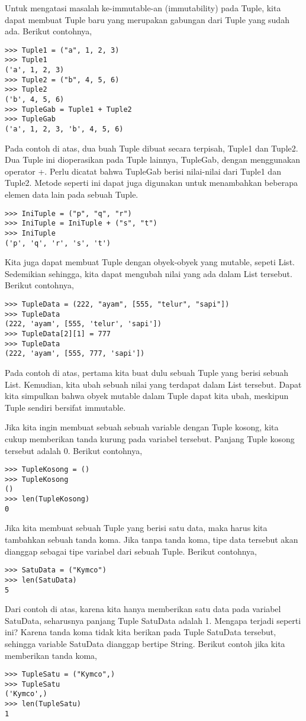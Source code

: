 Untuk mengatasi masalah ke-immutable-an (immutability) pada Tuple, kita dapat membuat Tuple baru yang merupakan gabungan dari Tuple yang sudah ada. Berikut contohnya,
\begin{verbatim}
>>> Tuple1 = ("a", 1, 2, 3)
>>> Tuple1
('a', 1, 2, 3)
>>> Tuple2 = ("b", 4, 5, 6)
>>> Tuple2
('b', 4, 5, 6)
>>> TupleGab = Tuple1 + Tuple2
>>> TupleGab
('a', 1, 2, 3, 'b', 4, 5, 6)
\end{verbatim}

Pada contoh di atas, dua buah Tuple dibuat secara terpisah, Tuple1 dan Tuple2. Dua Tuple ini dioperasikan pada Tuple lainnya, TupleGab, dengan menggunakan operator +. Perlu dicatat bahwa TupleGab berisi nilai-nilai dari Tuple1 dan Tuple2. Metode seperti ini dapat juga digunakan untuk menambahkan beberapa elemen data lain pada sebuah Tuple.
\begin{verbatim}
>>> IniTuple = ("p", "q", "r")
>>> IniTuple = IniTuple + ("s", "t")
>>> IniTuple
('p', 'q', 'r', 's', 't')
\end{verbatim}

Kita juga dapat membuat Tuple dengan obyek-obyek yang mutable, sepeti List. Sedemikian sehingga, kita dapat mengubah nilai yang ada dalam List tersebut. Berikut contohnya,
\begin{verbatim}
>>> TupleData = (222, "ayam", [555, "telur", "sapi"])
>>> TupleData
(222, 'ayam', [555, 'telur', 'sapi'])
>>> TupleData[2][1] = 777
>>> TupleData
(222, 'ayam', [555, 777, 'sapi'])
\end{verbatim}
Pada contoh di atas, pertama kita buat dulu sebuah Tuple yang berisi sebuah List. Kemudian, kita ubah sebuah nilai yang terdapat dalam List tersebut. Dapat kita simpulkan bahwa obyek mutable dalam Tuple dapat kita ubah, meskipun Tuple sendiri bersifat immutable.

Jika kita ingin membuat sebuah sebuah variable dengan Tuple kosong, kita cukup memberikan tanda kurung pada variabel tersebut. Panjang Tuple kosong tersebut adalah 0. Berikut contohnya,
\begin{verbatim}
>>> TupleKosong = ()
>>> TupleKosong
()
>>> len(TupleKosong)
0
\end{verbatim}
Jika kita membuat sebuah Tuple yang berisi satu data, maka harus kita tambahkan sebuah tanda koma. Jika tanpa tanda koma, tipe data tersebut akan dianggap sebagai tipe variabel dari sebuah Tuple. Berikut contohnya,
\begin{verbatim}
>>> SatuData = ("Kymco")
>>> len(SatuData)
5
\end{verbatim}
Dari contoh di atas, karena kita hanya memberikan satu data pada variabel SatuData, seharusnya panjang Tuple SatuData adalah 1. Mengapa terjadi seperti ini? Karena tanda koma tidak kita berikan pada Tuple SatuData tersebut, sehingga variable SatuData dianggap bertipe String. Berikut contoh jika kita memberikan tanda koma,
\begin{verbatim}
>>> TupleSatu = ("Kymco",)
>>> TupleSatu
('Kymco',)
>>> len(TupleSatu)
1
\end{verbatim}

